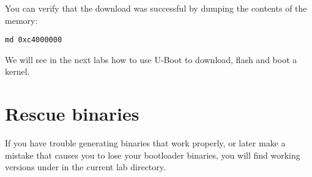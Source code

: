 You can verify that the download was successful by dumping the
contents of the memory:

\begin{verbatim}
md 0xc4000000
\end{verbatim}

We will see in the next labs how to use U-Boot to download, flash and
boot a kernel.

\section{Rescue binaries}

If you have trouble generating binaries that work properly, or later
make a mistake that causes you to lose your bootloader binaries, you
will find working versions under  in the current lab
directory.
